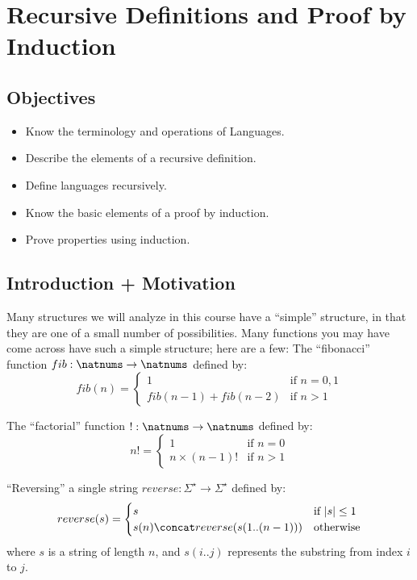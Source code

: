 \chapter{Recursive Definitions and Proof by Induction}

\section{Objectives}

\begin{itemize}
	\item Know the terminology and operations of Languages.
	\item Describe the elements of a recursive definition.
	\item Define languages recursively.
	\item Know the basic elements of a proof by induction.
	\item Prove properties using induction.
\end{itemize}

\section{Introduction + Motivation}

Many structures we will analyze in this course have a ``simple'' structure, in that they are one of a small number of possibilities. 
Many functions you may have come across have such a simple structure; here are a few:
The ``fibonacci'' function $fib: \natnums \to \natnums$ defined by:
\[
fib(n) = 
\begin{cases}
	1 & \text{if $n=0, 1$}\\
	fib(n-1) + fib(n-2) & \text{if $n > 1$}
\end{cases}
\]

The ``factorial'' function $!: \natnums \to \natnums$ defined by:
\[
n! = 
\begin{cases}
	1 & \text{if $n=0$}\\
	n \times (n-1)! & \text{if $n > 1$}
\end{cases}
\]

``Reversing'' a single string $reverse: \Sigma^\star \to \Sigma^\star$ defined by:
\[
reverse(s) = 
\begin{cases}
	s & \text{if $|s| \le 1$}\\
	s(n) \concat reverse(s(1..(n-1))) & \text{otherwise}
\end{cases}
\]
where $s$ is a string of length $n$, and $s(i..j)$ represents the substring from index $i$ to $j$.

